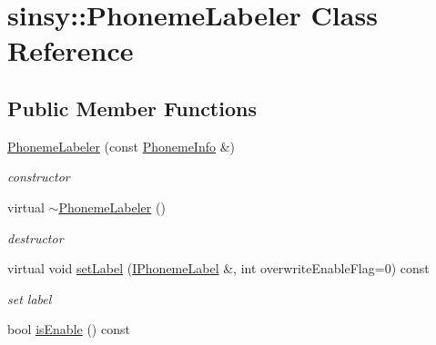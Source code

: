 \hypertarget{classsinsy_1_1PhonemeLabeler}{\section{sinsy\-:\-:\-Phoneme\-Labeler \-Class \-Reference}
\label{classsinsy_1_1PhonemeLabeler}
}
\subsection*{\-Public \-Member \-Functions}
\begin{DoxyCompactItemize}
\item 
\hypertarget{classsinsy_1_1PhonemeLabeler_a4c62e5d4d12f92b9810dc999182fcd54}{\hyperlink{classsinsy_1_1PhonemeLabeler_a4c62e5d4d12f92b9810dc999182fcd54}{\-Phoneme\-Labeler} (const \hyperlink{classsinsy_1_1PhonemeInfo}{\-Phoneme\-Info} \&)}\label{classsinsy_1_1PhonemeLabeler_a4c62e5d4d12f92b9810dc999182fcd54}

\begin{DoxyCompactList}\small\item\em constructor \end{DoxyCompactList}\item 
\hypertarget{classsinsy_1_1PhonemeLabeler_a4392240dc446f933cc9c2b07c2b7bff0}{virtual \hyperlink{classsinsy_1_1PhonemeLabeler_a4392240dc446f933cc9c2b07c2b7bff0}{$\sim$\-Phoneme\-Labeler} ()}\label{classsinsy_1_1PhonemeLabeler_a4392240dc446f933cc9c2b07c2b7bff0}

\begin{DoxyCompactList}\small\item\em destructor \end{DoxyCompactList}\item 
\hypertarget{classsinsy_1_1PhonemeLabeler_a8f66e8ba5f2f0f17ff91e939c22a78f9}{virtual void \hyperlink{classsinsy_1_1PhonemeLabeler_a8f66e8ba5f2f0f17ff91e939c22a78f9}{set\-Label} (\hyperlink{classsinsy_1_1IPhonemeLabel}{\-I\-Phoneme\-Label} \&, int overwrite\-Enable\-Flag=0) const }\label{classsinsy_1_1PhonemeLabeler_a8f66e8ba5f2f0f17ff91e939c22a78f9}

\begin{DoxyCompactList}\small\item\em set label \end{DoxyCompactList}\item 
\hypertarget{classsinsy_1_1PhonemeLabeler_a3888e47174b75faec5ea7d73c8d84d4d}{bool \hyperlink{classsinsy_1_1PhonemeLabeler_a3888e47174b75faec5ea7d73c8d84d4d}{is\-Enable} () const }\label{classsinsy_1_1PhonemeLabeler_a3888e47174b75faec5ea7d73c8d84d4d}


\end{DoxyCompactItemize}
